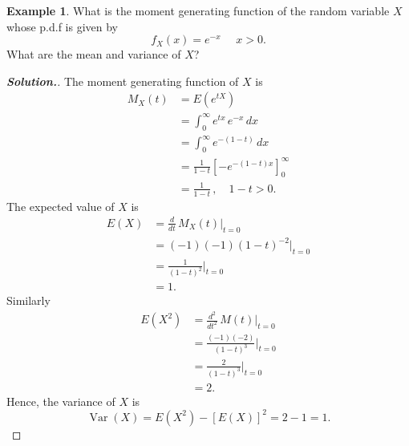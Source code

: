 \documentclass[12pt,a4paper]{report}
\theoremstyle{definition}
\newtheorem{example}[thm]{Example}
\theoremstyle{plain}
\theoremstyle{definition}
\begin{document}
\begin{example}
What is the moment generating function of the random variable $X$ whose p.d.f is given by \[f_X(x) = e^{-x}\, \, \quad x > 0.\] What are the mean and variance of $X$?
\end{example}

\begin{proof}[\textbf{\textit{Solution.}}]
The moment generating function of $X$ is 
\begin{align*}
M_X(t) & = E(e^{tX})\\
& = \int^{\infty}_0 e^{tx}\, e^{-x}\, dx\\
& = \int^{\infty}_0e^{-(1-t)}\, dx\\
& = \frac{1}{1-t}\left[-e^{-(1-t)x}\right]^{\infty}_0\\
& = \frac{1}{1-t}\, ,\quad 1 - t > 0.
\end{align*}
The expected value of $X$ is
\begin{align*}
E(X) & = \frac{d}{dt}\, M_X(t)|_{t = 0}\\
& = (-1)(-1)(1-t)^{-2}|_{t =0}\\
& = \frac{1}{(1-t)^2}\Bigg|_{t = 0}\\
& = 1.
\end{align*}
Similarly
\begin{align*}
E(X^2) & = \frac{d^2}{dt^2}\, M(t)\Big|_{t = 0}\\
& = \frac{(-1)(-2)}{(1 - t)^3}\Big|_{t = 0}\\
& = \frac{2}{(1 - t)^3}\Bigg|_{t = 0}\\
& = 2.
\end{align*}
Hence, the variance of $X$ is \[\operatorname{Var}(X) = E(X^2) - [E(X)]^2 = 2 - 1 = 1.\]
\end{proof}
\end{document}
